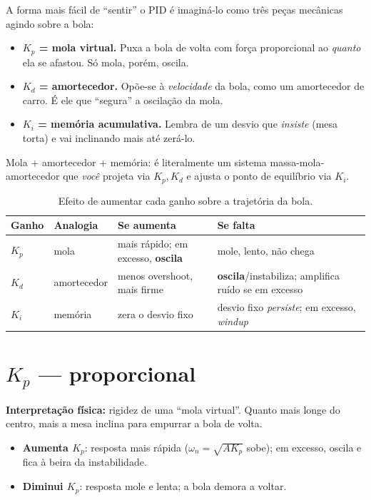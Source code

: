 \begin{intuicao}
A forma mais f\'acil de ``sentir'' o PID \'e imagin\'a-lo como tr\^es pe\c{c}as
mec\^anicas agindo sobre a bola:
\begin{itemize}[leftmargin=1.4em]
  \item \textbf{$K_p$ = mola virtual.} Puxa a bola de volta com for\c{c}a
  proporcional ao \emph{quanto} ela se afastou. S\'o mola, por\'em, oscila.
  \item \textbf{$K_d$ = amortecedor.} Op\~oe-se \`a \emph{velocidade} da bola, como
  um amortecedor de carro. \'E ele que ``segura'' a oscila\c{c}\~ao da mola.
  \item \textbf{$K_i$ = mem\'oria acumulativa.} Lembra de um desvio que
  \emph{insiste} (mesa torta) e vai inclinando mais at\'e zer\'a-lo.
\end{itemize}
Mola + amortecedor + mem\'oria: \'e literalmente um sistema massa-mola-amortecedor
que \emph{voc\^e} projeta via $K_p,K_d$ e ajusta o ponto de equil\'ibrio via $K_i$.
\end{intuicao}

\begin{table}[h]\centering
\caption{Efeito de aumentar cada ganho sobre a trajet\'oria da bola.}
\label{tab:pidresumo}
\small
\begin{tabularx}{\textwidth}{l l X X}
\toprule
Ganho & Analogia & Se \textbf{aumenta} & Se \textbf{falta} \\
\midrule
$K_p$ & mola & mais r\'apido; em excesso, \textbf{oscila} & mole, lento, n\~ao chega \\
$K_d$ & amortecedor & menos overshoot, mais firme & \textbf{oscila}/instabiliza; amplifica ru\'ido se em excesso \\
$K_i$ & mem\'oria & zera o desvio fixo & desvio fixo \emph{persiste}; em excesso, \emph{windup} \\
\bottomrule
\end{tabularx}
\end{table}

\section{$K_p$ --- proporcional}
\textbf{Interpreta\c{c}\~ao f\'isica:} rigidez de uma ``mola virtual''. Quanto mais
longe do centro, mais a mesa inclina para empurrar a bola de volta.
\begin{itemize}[leftmargin=1.4em]
  \item \textbf{Aumenta $K_p$}: resposta mais r\'apida ($\omega_n=\sqrt{AK_p}$
  sobe); em excesso, oscila e fica \`a beira da instabilidade.
  \item \textbf{Diminui $K_p$}: resposta mole e lenta; a bola demora a voltar.
\end{itemize}

